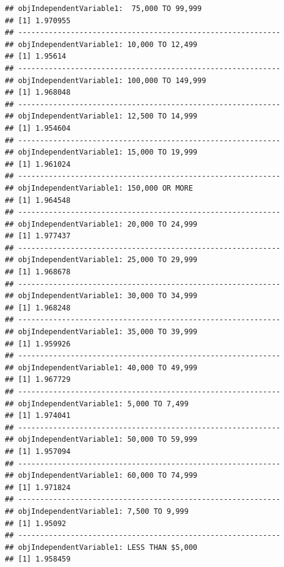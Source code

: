 \documentclass[
  man,LLO-8200, Introduction to Data Science]{apa6}
\begin{document}
\begin{verbatim}
## objIndependentVariable1:  75,000 TO 99,999
## [1] 1.970955
## ------------------------------------------------------------ 
## objIndependentVariable1: 10,000 TO 12,499
## [1] 1.95614
## ------------------------------------------------------------ 
## objIndependentVariable1: 100,000 TO 149,999
## [1] 1.968048
## ------------------------------------------------------------ 
## objIndependentVariable1: 12,500 TO 14,999
## [1] 1.954604
## ------------------------------------------------------------ 
## objIndependentVariable1: 15,000 TO 19,999
## [1] 1.961024
## ------------------------------------------------------------ 
## objIndependentVariable1: 150,000 OR MORE
## [1] 1.964548
## ------------------------------------------------------------ 
## objIndependentVariable1: 20,000 TO 24,999
## [1] 1.977437
## ------------------------------------------------------------ 
## objIndependentVariable1: 25,000 TO 29,999
## [1] 1.968678
## ------------------------------------------------------------ 
## objIndependentVariable1: 30,000 TO 34,999
## [1] 1.968248
## ------------------------------------------------------------ 
## objIndependentVariable1: 35,000 TO 39,999
## [1] 1.959926
## ------------------------------------------------------------ 
## objIndependentVariable1: 40,000 TO 49,999
## [1] 1.967729
## ------------------------------------------------------------ 
## objIndependentVariable1: 5,000 TO 7,499
## [1] 1.974041
## ------------------------------------------------------------ 
## objIndependentVariable1: 50,000 TO 59,999
## [1] 1.957094
## ------------------------------------------------------------ 
## objIndependentVariable1: 60,000 TO 74,999
## [1] 1.971824
## ------------------------------------------------------------ 
## objIndependentVariable1: 7,500 TO 9,999
## [1] 1.95092
## ------------------------------------------------------------ 
## objIndependentVariable1: LESS THAN $5,000
## [1] 1.958459
\end{verbatim}
\end{document}

